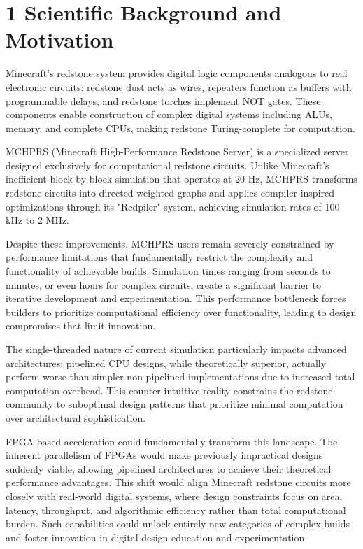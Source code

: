 \documentclass[a4paper,11pt]{article}
\begin{document}
\section*{1 Scientific Background and Motivation}

Minecraft's redstone system provides digital logic components analogous to real electronic circuits: redstone dust acts as wires, repeaters function as buffers with programmable delays, and redstone torches implement NOT gates.
These components enable construction of complex digital systems including ALUs, memory, and complete CPUs, making redstone Turing-complete for computation.

MCHPRS (Minecraft High-Performance Redstone Server) is a specialized server designed exclusively for computational redstone circuits.
Unlike Minecraft's inefficient block-by-block simulation that operates at 20 Hz, MCHPRS transforms redstone circuits into directed weighted graphs and applies compiler-inspired optimizations through its "Redpiler" system, achieving simulation rates of 100 kHz to 2 MHz.

Despite these improvements, MCHPRS users remain severely constrained by performance limitations that fundamentally restrict the complexity and functionality of achievable builds.
Simulation times ranging from seconds to minutes, or even hours for complex circuits, create a significant barrier to iterative development and experimentation.
This performance bottleneck forces builders to prioritize computational efficiency over functionality, leading to design compromises that limit innovation.

The single-threaded nature of current simulation particularly impacts advanced architectures: pipelined CPU designs, while theoretically superior, actually perform worse than simpler non-pipelined implementations due to increased total computation overhead.
This counter-intuitive reality constrains the redstone community to suboptimal design patterns that prioritize minimal computation over architectural sophistication.

FPGA-based acceleration could fundamentally transform this landscape.
The inherent parallelism of FPGAs would make previously impractical designs suddenly viable, allowing pipelined architectures to achieve their theoretical performance advantages.
This shift would align Minecraft redstone circuits more closely with real-world digital systems, where design constraints focus on area, latency, throughput, and algorithmic efficiency rather than total computational burden.
Such capabilities could unlock entirely new categories of complex builds and foster innovation in digital design education and experimentation.
\end{document}

